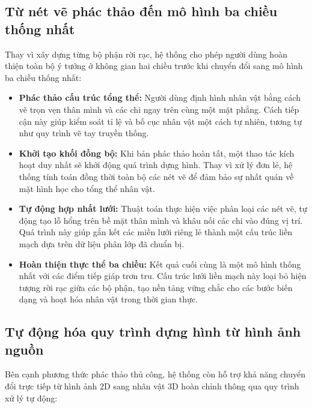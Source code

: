\documentclass{report}
\begin{document}
\subsection{Từ nét vẽ phác thảo đến mô hình ba chiều thống nhất}

Thay vì xây dựng từng bộ phận rời rạc, hệ thống cho phép người dùng hoàn thiện toàn bộ ý tưởng ở không gian hai chiều trước khi chuyển đổi sang mô hình ba chiều thống nhất:

\begin{itemize}
    \item \textbf{Phác thảo cấu trúc tổng thể:} Người dùng định hình nhân vật bằng cách vẽ trọn vẹn thân mình và các chi ngay trên cùng một mặt phẳng. Cách tiếp cận này giúp kiểm soát tỉ lệ và bố cục nhân vật một cách tự nhiên, tương tự như quy trình vẽ tay truyền thống.
    
    \item \textbf{Khởi tạo khối đồng bộ:} Khi bản phác thảo hoàn tất, một thao tác kích hoạt duy nhất sẽ khởi động quá trình dựng hình. Thay vì xử lý đơn lẻ, hệ thống tính toán đồng thời toàn bộ các nét vẽ để đảm bảo sự nhất quán về mặt hình học cho tổng thể nhân vật.
    
    \item \textbf{Tự động hợp nhất lưới:} Thuật toán thực hiện việc phân loại các nét vẽ, tự động tạo lỗ hổng trên bề mặt thân mình và khâu nối các chi vào đúng vị trí. Quá trình này giúp gắn kết các miền lưới riêng lẻ thành một cấu trúc liền mạch dựa trên dữ liệu phân lớp đã chuẩn bị.
    
    \item \textbf{Hoàn thiện thực thể ba chiều:} Kết quả cuối cùng là một mô hình thống nhất với các điểm tiếp giáp trơn tru. Cấu trúc lưới liền mạch này loại bỏ hiện tượng rời rạc giữa các bộ phận, tạo nền tảng vững chắc cho các bước biến dạng và hoạt hóa nhân vật trong thời gian thực.
\end{itemize}

\subsection{Tự động hóa quy trình dựng hình từ hình ảnh nguồn}

Bên cạnh phương thức phác thảo thủ công, hệ thống còn hỗ trợ khả năng chuyển đổi trực tiếp từ hình ảnh 2D sang nhân vật 3D hoàn chỉnh thông qua quy trình xử lý tự động:
\end{document}
